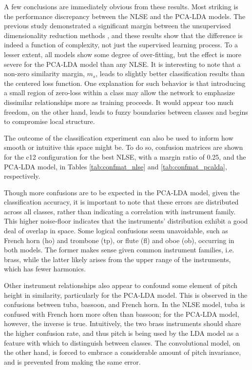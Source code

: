 A few conclusions are immediately obvious from these results.
Most striking is the performance discrepancy between the NLSE and the PCA-LDA models.
The previous study demonstrated a significant margin between the unsupervised dimensionality reduction methods \cite{Humphrey2011Nonlinear}, and these results show that the difference is indeed a function of complexity, not just the supervised learning process.
To a lesser extent, all models show some degree of over-fitting, but the effect is more severe for the PCA-LDA model than any NLSE.
It is interesting to note that a non-zero similarity margin, $m_s$, leads to slightly better classification results than the centered loss function.
One explanation for such behavior is that introducing a small region of zero-loss within a class may allow the network to emphasize dissimilar relationships more as training proceeds.
It would appear too much freedom, on the other hand, leads to fuzzy boundaries between classes and begins to compromise local structure.

The outcome of the classification experiment can also be used to inform how smooth or intuitive this space might be.
To do so, confusion matrices are shown for the c12 configuration for the best NLSE, with a margin ratio of 0.25, and the PCA-LDA model, in Tables \ref{tab:confmat_nlse} and \ref{tab:confmat_pcalda}, respectively.

Though more confusions are to be expected in the PCA-LDA model, given the classification accuracy, it is important to note that these errors are distributed across all classes, rather than indicating a correlation with instrument family.
This higher noise-floor indicates that the instruments' distribution exhibit a good deal of overlap in space.
Some logical confusions seem unavoidable, such as French horn (ho) and trombone (tp), or flute (fl) and oboe (ob), occurring in both models.
The former makes sense given common instrument families, i.e. brass, while the latter likely arises from the upper range of the instruments, which has fewer harmonics.

Other instrument relationships also appear to confound some element of pitch height in similarity, particularly for the PCA-LDA model.
This is observed in the confusions between tuba, bassoon, and French horn.
In the NLSE model, tuba is confused with French horn more often than bassoon; for the PCA-LDA model, however, the inverse is true.
Intuitively, the two brass instruments should share the higher confusion rate, and thus pitch is being used by the LDA model as a feature with which to distinguish between classes.
The convolutional model, on the other hand, is forced to embrace a considerable amount of pitch invariance, and is prevented from making the same error.


